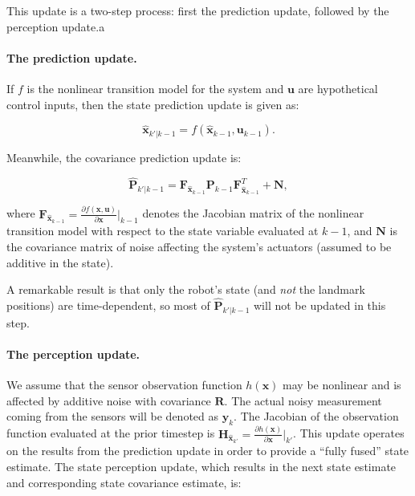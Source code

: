This update is a two-step process: first the prediction update, followed by the perception update.a

\paragraph{The prediction update.} If $f$ is the nonlinear transition model for the system and $\boldsymbol{u}$ are hypothetical control inputs, then the state prediction update is given as:

\begin{equation}
    \hat{\boldsymbol{x}}_{k'|k-1}= f(\hat{\boldsymbol{x}}_{k-1},\boldsymbol{u}_{k-1}).
\end{equation}

Meanwhile, the covariance prediction update is:

\begin{equation}
    \hat{\boldsymbol{P}}_{k'|k-1} = \boldsymbol{F}_{\hat{\boldsymbol{x}}_{k-1}} \boldsymbol{P}_{k-1} \boldsymbol{F}_{\hat{\boldsymbol{x}}_{k-1}}^T + \boldsymbol{N},
\end{equation}

\noindent where $\boldsymbol{F}_{\hat{\boldsymbol{x}}_{k-1}} = \frac{\partial f(\boldsymbol{x},\boldsymbol{u})}{\partial \boldsymbol{x}}|_{k-1}$ denotes the Jacobian matrix of the nonlinear transition model with respect to the state variable evaluated at $k-1$, and $\boldsymbol{N}$ is the covariance matrix of noise affecting the system's actuators (assumed to be additive in the state).

A remarkable result is that only the robot's state (and \emph{not} the landmark positions) are time-dependent, so most of $\hat{\boldsymbol{P}}_{k'|k-1}$ will not be updated in this step.

\paragraph{The perception update.} We assume that the sensor observation function $h(\boldsymbol{x})$ may be nonlinear and is affected by additive noise with covariance $\boldsymbol{R}$. The actual noisy measurement coming from the sensors will be denoted as $\boldsymbol{y}_{k}$. The Jacobian of the observation function evaluated at the prior timestep is $\boldsymbol{H}_{\hat{\boldsymbol{x}}_{k'}} = \frac{\partial h(\boldsymbol{x})}{\partial \boldsymbol{x}}|_{k'}$. This update operates on the results from the prediction update in order to provide a ``fully fused'' state estimate. The state perception update, which results in the next state estimate and corresponding state covariance estimate, is:

